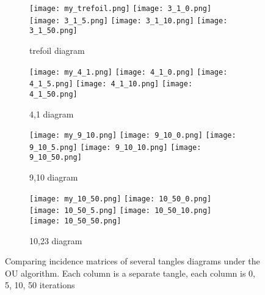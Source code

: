 \begin{figure}[H]
\centering
\begin{subfigure}{0.24\textwidth}
\centering
\texttt{[image: my\_trefoil.png]} \vfill
\texttt{[image: 3\_1\_0.png]}       \vfill\vspace{1mm}
\texttt{[image: 3\_1\_5.png]}       \vfill\vspace{1mm}
\texttt{[image: 3\_1\_10.png]}      \vfill\vspace{1mm}
\texttt{[image: 3\_1\_50.png]}
\caption{trefoil diagram}
\end{subfigure}
\hfill
\begin{subfigure}{0.24\textwidth}
\centering
\texttt{[image: my\_4\_1.png]} \vfill
\texttt{[image: 4\_1\_0.png]}  \vfill\vspace{1mm}
\texttt{[image: 4\_1\_5.png]}  \vfill\vspace{1mm}
\texttt{[image: 4\_1\_10.png]} \vfill\vspace{1mm}
\texttt{[image: 4\_1\_50.png]} \vfill\vspace{1mm}
\caption{4,1 diagram}
\end{subfigure}
\hfill
\begin{subfigure}{0.24\textwidth}
\centering
\texttt{[image: my\_9\_10.png]} \vfill
\texttt{[image: 9\_10\_0.png]}  \vfill\vspace{1mm}
\texttt{[image: 9\_10\_5.png]}  \vfill\vspace{1mm}
\texttt{[image: 9\_10\_10.png]} \vfill\vspace{1mm}
\texttt{[image: 9\_10\_50.png]} \vfill\vspace{1mm}
\caption{9,10 diagram}
\end{subfigure}
\hfill
\begin{subfigure}{0.24\textwidth}
\centering
\texttt{[image: my\_10\_50.png]} \vfill
\texttt{[image: 10\_50\_0.png]}  \vfill\vspace{1mm}
\texttt{[image: 10\_50\_5.png]}  \vfill\vspace{1mm}
\texttt{[image: 10\_50\_10.png]} \vfill\vspace{1mm}
\texttt{[image: 10\_50\_50.png]} \vfill\vspace{1mm}
\caption{10,23 diagram}
\end{subfigure}
\caption{Comparing incidence matrices of several tangles diagrams under the OU algorithm. Each column is a separate tangle, each column is 0, 5, 10, 50 iterations}
\label{fig:varioustangleexamples}
\end{figure}
